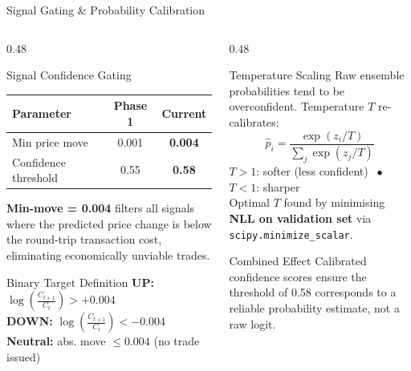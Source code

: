 \documentclass[aspectratio=43,11pt]{beamer}
\begin{document}
\begin{frame}[shrink=8]{Signal Gating \& Probability Calibration}
    \begin{columns}[T]
        \begin{column}{0.48\textwidth}
            \begin{block}{Signal Confidence Gating}
                \footnotesize
                \begin{center}
                \begin{tabular}{lcc}
                    \toprule
                    \textbf{Parameter} & \textbf{Phase 1} & \textbf{Current} \\
                    \midrule
                    Min price move     & 0.001 & \textbf{0.004} \\
                    Confidence threshold & 0.55 & \textbf{0.58} \\
                    \bottomrule
                \end{tabular}
                \end{center}
                \vspace{0.1cm}
                \textbf{Min-move = 0.004} filters all signals where the predicted price change is below the round-trip transaction cost, eliminating economically unviable trades.
            \end{block}
            \begin{alertblock}{Binary Target Definition}
                \footnotesize
                \textbf{UP:} $\log\!\left(\tfrac{C_{t+1}}{C_t}\right) > +0.004$ \\[3pt]
                \textbf{DOWN:} $\log\!\left(\tfrac{C_{t+1}}{C_t}\right) < -0.004$ \\[3pt]
                \textbf{Neutral:} abs. move $\leq 0.004$ (no trade issued)
            \end{alertblock}
        \end{column}
        \begin{column}{0.48\textwidth}
            \begin{block}{Temperature Scaling}
                \footnotesize Raw ensemble probabilities tend to be overconfident. Temperature $T$ re-calibrates:
                \vspace{0.1cm}
                $$\hat{p}_i = \frac{\exp(z_i / T)}{\displaystyle\sum_j \exp(z_j / T)}$$
                \vspace{0.1cm}
                $T>1$: softer (less confident) $\;\bullet\;$ $T<1$: sharper \\[4pt]
                Optimal $T$ found by minimising \textbf{NLL on validation set} via \texttt{scipy.minimize\_scalar}.
            \end{block}
            \begin{exampleblock}{Combined Effect}
                \footnotesize Calibrated confidence scores ensure the threshold of 0.58 corresponds to a reliable probability estimate, not a raw logit.
            \end{exampleblock}
        \end{column}
    \end{columns}
\end{frame}
\end{document}
